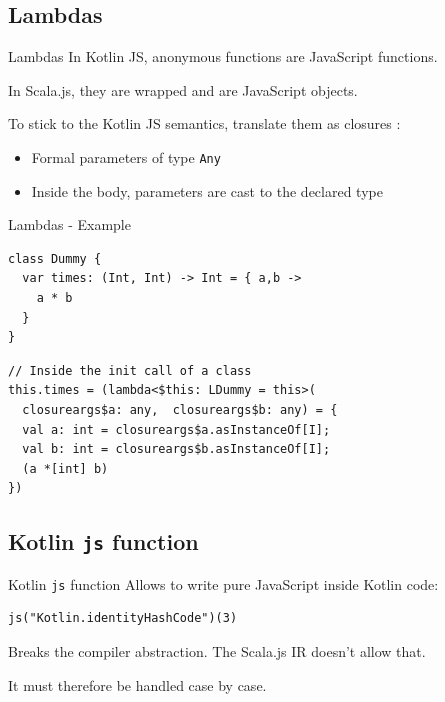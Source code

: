 \documentclass[10pt,usenames,dvipsnames]{beamer}
\newcommand{\inlinecode}[2]{\colorbox{minted-bg}{\lstinline[language=#1]$#2$}}
\newcommand{\ktinline}[1]{\inlinecode{kotlin}{#1}}
\begin{document}

\subsection{Lambdas}

\begin{frame}[fragile]{Lambdas}
 In Kotlin JS, anonymous functions are JavaScript functions.
 
 In Scala.js, they are wrapped and are JavaScript objects.
 
 
 To stick to the Kotlin JS semantics, translate them as closures :
 \begin{itemize}
  \item Formal parameters of type \ktinline{Any}
  \item Inside the body, parameters are cast to the declared type
 \end{itemize}
\end{frame}

\begin{frame}[fragile]{Lambdas - Example}
 \begin{verbatim}
class Dummy {
  var times: (Int, Int) -> Int = { a,b ->
    a * b
  }
}
 \end{verbatim}
 \begin{verbatim}
// Inside the init call of a class
this.times = (lambda<$this: LDummy = this>(
  closureargs$a: any,  closureargs$b: any) = {
  val a: int = closureargs$a.asInstanceOf[I];
  val b: int = closureargs$b.asInstanceOf[I];
  (a *[int] b)
})
 \end{verbatim}
 
\end{frame}
 

\subsection{Kotlin \ktinline{js} function}

\begin{frame}[fragile]{Kotlin \ktinline{js} function}
  Allows to write pure JavaScript inside Kotlin code:
  
  \begin{verbatim}
js("Kotlin.identityHashCode")(3)
  \end{verbatim}


  Breaks the compiler abstraction. The Scala.js IR doesn't allow that.
  
  It must therefore be handled case by case.

\end{frame}
\end{document}
